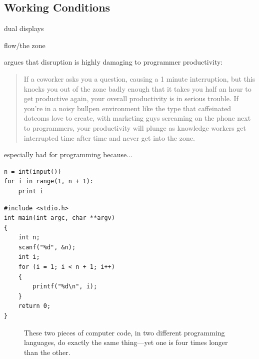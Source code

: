 \documentclass[letterpaper, 12pt]{report}
\begin{document}
\subsection{Working Conditions}
dual displays

flow/the zone

\textcite{spolsky:list} argues that disruption is highly damaging to programmer productivity:
\begin{quote}
If a coworker asks you a question, causing a 1 minute interruption, but this knocks you out of the zone badly enough that it takes you half an hour to get productive again, your overall productivity is in serious trouble. 
If you're in a noisy bullpen environment like the type that caffeinated dotcoms love to create, with marketing guys screaming on the phone next to programmers, your productivity will plunge as knowledge workers get interrupted time after time and never get into the zone.
\end{quote}

especially bad for programming because...

\newsavebox{\pythonexample}
\begin{lrbox}{\pythonexample}
\begin{lstlisting}
n = int(input())
for i in range(1, n + 1):
	print i
\end{lstlisting}
\end{lrbox}

\newsavebox{\cexample}
\begin{lrbox}{\cexample}
\begin{lstlisting}
#include <stdio.h>
int main(int argc, char **argv) 
{
	int n;
	scanf("%d", &n);
	int i;
	for (i = 1; i < n + 1; i++) 
	{
		printf("%d\n", i);
	}
	return 0;
}
\end{lstlisting}
\end{lrbox}

\begin{figure}
{\caption{These two pieces of computer code, in two different programming languages, do exactly the same thing---yet one is four times longer than the other.}\label{fig:codelineexample}}
\end{figure}
\end{document}
